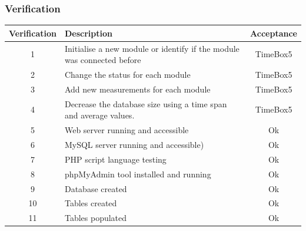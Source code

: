 %	
\subsubsection{Verification}
\begin{table}[H]
\centering
	\begin{tabular}{| c | l | c |}
		\hline
		Verification & Description & Acceptance \\\hline
		1 & Initialise a new module or identify if the module was connected before & TimeBox5 \\\hline
		2 & Change the status for each module & TimeBox5 \\\hline
		3 & Add new measurements for each module & TimeBox5 \\\hline
		4 & Decrease the database size using a time span and average values. & TimeBox5 \\\hline
		5 & Web server running and accessible & Ok \\\hline
		6 & MySQL server running and accessible) & Ok \\\hline
		7 & PHP script language testing & Ok \\\hline
		8 & phpMyAdmin tool installed and running & Ok \\\hline
		9 & Database created & Ok \\\hline
		10 & Tables created & Ok \\\hline
		11 & Tables populated & Ok \\\hline
	\end{tabular}
\end{table}

